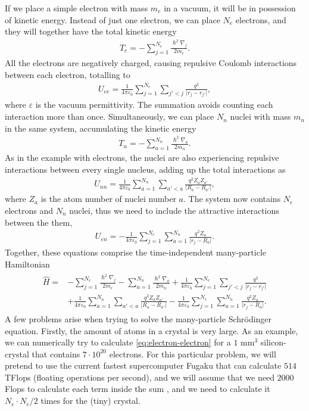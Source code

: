 If we place a simple electron with mass $m_e$ in a vacuum, it will be in possession of kinetic energy. Instead of just one electron, we can place $N_e$ electrons, and they will together have the total kinetic energy
\begin{align}
  T_e = - \sum_{j=1}^{N_e} \frac{\hslash^2\nabla_j}{2m_e}.
\end{align}
All the electrons are negatively charged, causing repulsive Coulomb interactions between each electron, totalling to
\begin{align}
  U_{ee} = \frac{1}{4\pi\varepsilon_0}\sum_{j=1}^{N_e}\sum_{j'<j} \frac{q^2}{\lvert r_j - r_{j'}\rvert},
  \label{eq:electron-electron}
\end{align}
where $\varepsilon$ is the vacuum permittivity. The summation avoids counting each interaction more than once. Simultaneously, we can place $N_n$ nuclei with mass $m_n$ in the same system, accumulating the kinetic energy
\begin{align}
  T_n = - \sum_{a=1}^{N_n} \frac{\hslash^2\nabla_a}{2m_n}.
\end{align}
As in the example with electrons, the nuclei are also experiencing repulsive interactions between every single nucleus, adding up the total interactions as
\begin{align}
  U_{nn} = \frac{1}{4\pi\varepsilon_0}\sum_{a=1}^{N_n}\sum_{a'<a} \frac{q^2 Z_aZ_{a'}}{\lvert R_a - R_{a'}\rvert },
\end{align}
where $Z_a$ is the atom number of nuclei number $a$. The system now contains $N_e$ electrons and $N_n$ nuclei, thus we need to include the attractive interactions between the them,
\begin{align}
  U_{en} = - \frac{1}{4\pi\varepsilon_0}\sum_{j=1}^{N_e} \sum_{a=1}^{N_n} \frac{q^2Z_a}{\lvert r_j-R_a\rvert}.
\end{align} Together, these equations comprise the time-independent many-particle Hamiltonian
\begin{align}
  \begin{aligned}
    \hat{H} = &- \sum_{j=1}^{N_e} \frac{\hslash^2\nabla_j}{2m_e}
    - \sum_{a=1}^{N_n} \frac{\hslash^2\nabla_a}{2m_n}
    + \frac{1}{4\pi\varepsilon_0} \sum_{j=1}^{N_e}\sum_{j'<j} \frac{q^2}{\lvert r_j - r_{j'}\rvert} \\
    &+\frac{1}{4\pi\varepsilon_0}\sum_{a=1}^{N_n}\sum_{a'<a} \frac{q^2 Z_aZ_{a'}}{\lvert R_a - R_{a'}\rvert } - \frac{1}{4\pi\varepsilon_0}\sum_{j=1}^{N_e} \sum_{a=1}^{N_n} \frac{q^2Z_a}{\lvert r_j-R_a\rvert}.
  \end{aligned}
\end{align} A few problems arise when trying to solve the many-particle Schrödinger equation. Firstly, the amount of atoms in a crystal is very large. As an example, we can numerically try to calculate \autoref{eq:electron-electron} for a $1$ mm$^3$ silicon-crystal that contains $7\cdot 10^{20}$ electrons. For this particular problem, we will pretend to use the current fastest supercomputer Fugaku \cite{Top500} that can calculate $514$ TFlops (floating operations per second), and we will assume that we need $2000$ Flops to calculate each term inside the sum \cite{Persson2020}, and we need to calculate it $N_e \cdot N_e/2$ times for the (tiny) crystal.
